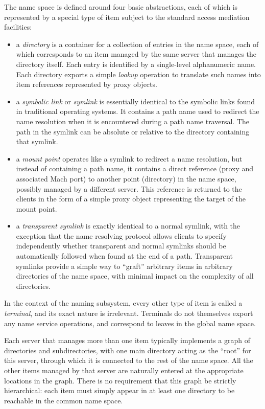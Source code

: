 The name space is defined around four basic abstractions, each of
which is represented by a special type of item subject to the standard
access mediation facilities:
\begin{itemize}

\item a {\em directory} is a container for a collection of entries in
the name space, each of which corresponds to an item managed by the
same server that manages the directory itself. Each entry is
identified by a single-level alphanumeric name. Each directory exports
a simple {\em lookup} operation to translate such names into item
references represented by proxy objects.

\item a {\em symbolic link} or {\em symlink} is essentially identical
to the symbolic links found in traditional operating systems. It
contains a path name used to redirect the name resolution when it is
encountered during a path name traversal. The path in the symlink can
be absolute or relative to the directory containing that symlink.

\item a {\em mount point} operates like a symlink to redirect a name
resolution, but instead of containing a path name, it contains a
direct reference (proxy and associated Mach port) to another point
(directory) in the name space, possibly managed by a different server.
This reference is returned to the clients in the form of a simple
proxy object representing the target of the mount point.

\item a {\em transparent symlink} is exactly identical to a normal
symlink, with the exception that the name resolving protocol allows
clients to specify independently whether transparent and normal
symlinks should be automatically followed when found at the end of a
path.  Transparent symlinks provide a simple way to ``graft''
arbitrary items in arbitrary directories of the name space, with
minimal impact on the complexity of all directories.

\end{itemize}
In the context of the naming subsystem, every other type of item
is called a {\em terminal}, and its exact nature is irrelevant.
Terminals do not themselves export any name service operations, and
correspond to leaves in the global name space.

Each server that manages more than one item typically implements a
graph of directories and subdirectories, with one main directory
acting as the ``root'' for this server, through which it is connected
to the rest of the name space. All the other items managed by that
server are naturally entered at the appropriate locations in the
graph. There is no requirement that this graph be strictly
hierarchical: each item must simply appear in at least one directory
to be reachable in the common name space.  


